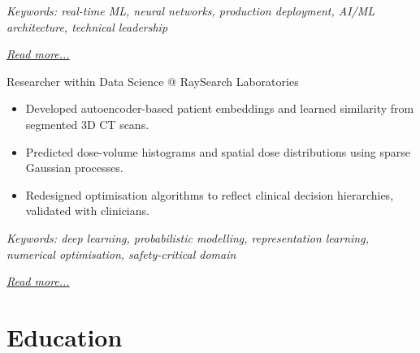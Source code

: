 \documentclass[11pt,a4paper]{moderncv}
\begin{document}
{\footnotesize\textit{Keywords: real-time ML, neural networks, production deployment, AI/ML architecture, technical leadership}}

\hfill{\small{\textit{\hyperref[sec:valcon]{Read more...}}}}

\large{Researcher within Data Science @ RaySearch Laboratories}
\normalsize
\begin{itemize}
    \item Developed autoencoder-based patient embeddings and learned similarity from segmented 3D CT scans.
    \item Predicted dose-volume histograms and spatial dose distributions using sparse Gaussian processes.
    \item Redesigned optimisation algorithms to reflect clinical decision hierarchies, validated with clinicians.
\end{itemize}

{\footnotesize\textit{Keywords: deep learning, probabilistic modelling, representation learning, numerical optimisation, safety-critical domain}}

\hfill{\small{\textit{\hyperref[sec:raysearch]{Read more...}}}}

\section{Education}





\end{document}
